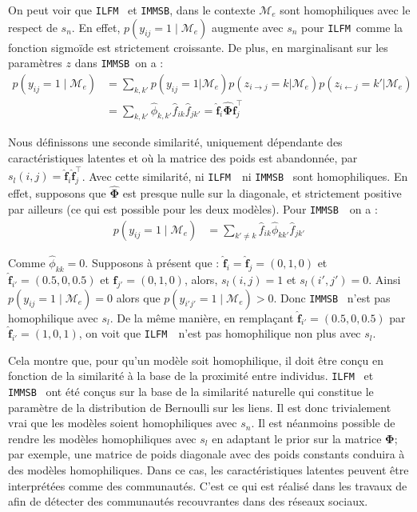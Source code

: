 \documentclass[french]{hermes-journal}
\newcommand{\ilfm}{\texttt{ILFM}}
\newcommand{\immsb}{\texttt{IMMSB}}
\newcommand{\pr}{p}
\newcommand{\M}{\mathcal{M}}
\newcommand{\mat}[1]{\bm{#1}}
\begin{document}
On peut voir que \ilfm~  et \immsb, dans le contexte $\mathcal{M}_e$ sont homophiliques avec le respect de $s_n$. En effet, $\pr(y_{ij}=1 \mid \mathcal{M}_e)$ augmente avec $s_n$  pour  \ilfm\ comme la fonction sigmoïde est strictement croissante. De plus, en marginalisant sur les paramètres $z$ dans \immsb\ on a :
\begin{align}
    \pr(y_{ij} =1 \mid \mathcal{M}_e) & = \sum_{k,k'} \pr(y_{ij}=1|\mathcal{M}_e) \pr(z_{i \rightarrow j}=k | \mathcal{M}_e) \pr(z_{i \leftarrow j}=k' | \mathcal{M}_e) \nonumber \\
& = \sum_{k,k'} \hat{\phi}_{k,k'} \hat{f}_{ik} \hat{f}_{jk'} = \mat{\hat{f}}_{i} \mat{\hat{\Phi}} \mat{\hat{f}}_j^\top \nonumber
\end{align}


Nous définissons une seconde similarité, uniquement dépendante des caractéristiques latentes et où la matrice des poids est abandonnée, par $s_l(i,j) = \mat{\hat{f}}_{i} \mat{\hat{f}}_j^\top$. Avec cette similarité, ni \ilfm~ ni \immsb~ sont homophiliques. En effet, supposons que $\mat{\hat{\Phi}}$ est presque nulle sur la diagonale, et strictement positive par ailleurs (ce qui est possible pour les deux modèles). Pour \immsb~ on a :
\begin{align*} 
\pr(y_{ij}=1 \mid \M_e) & = \sum_{k' \neq k} \hat{f}_{ik} \hat{\phi}_{kk'} \hat{f}_{jk'}
\end{align*}


Comme $\hat{\phi}_{kk} = 0$.  Supposons à présent que : $\mat{\hat{f}}_i=\mat{\hat{f}}_j=(0,1,0)$ et $\mat{\hat{f}}_{i'}=(0.5,0,0.5)$ et $\mat{\hat{f}}_{j'}=(0,1,0)$, alors, $s_l(i,j)=1$ et $s_l(i',j')=0$. Ainsi $\pr(y_{ij}=1 \mid \M_e) = 0$ alors que $\pr(y_{i'j'}=1 \mid \M_e) > 0$. Donc \immsb~ n'est pas homophilique avec $s_l$. De la même manière, en remplaçant $\mat{\hat{f}}_{i'}=(0.5,0,0. 5)$ par $\mat{\hat{f}}_{i'}=(1,0,1)$, on voit que \ilfm~ n'est pas homophilique non plus avec $s_l$.

Cela montre que, pour qu'un modèle soit homophilique, il doit être conçu en fonction de la similarité à la base de la proximité entre individus. \ilfm~ et \immsb~ ont été conçus sur la base de la similarité naturelle qui constitue le paramètre de la distribution de Bernoulli sur les liens. Il est donc trivialement vrai que les modèles soient homophiliques avec $s_n$. Il est néanmoins possible de rendre les modèles homophiliques avec $s_l$ en adaptant le prior sur la matrice $\mat{\Phi}$; par exemple, une matrice de poids diagonale avec des poids constants conduira à des modèles homophiliques. Dans ce cas, les caractéristiques latentes peuvent être interprétées comme des communautés. C'est ce qui est réalisé dans les travaux de \cite{AMMSB} afin de détecter des communautés recouvrantes dans des réseaux sociaux.
\end{document}
